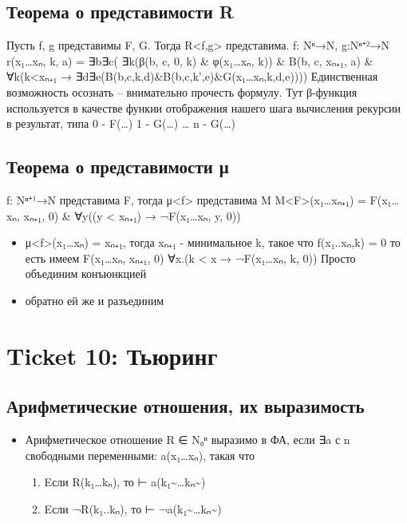 \documentclass[11pt]{article}
\begin{document}
\subsection{Теорема о представимости R}
\label{sec-11-6}
Пусть f, g представимы F, G. Тогда R<f,g> представима.
f: Nⁿ→N, g:Nⁿ⁺²→N
r(x₁\ldots{}xₙ, k, a) =
   ∃b∃c(
        ∃k(β(b, c, 0, k) \& φ(x₁\ldots{}xₙ, k))
        \& B(b, c, xₙ₊₁, a)
        \& ∀k(k<xₙ₊₁ → ∃d∃e(B(b,c,k,d)\&B(b,c,k',e)\&G(x₁\ldots{}xₙ,k,d,e))))
Единственная возможность осознать -- внимательно прочесть формулу.
Тут β-функция используется в качестве функии отображения нашего шага
вычисления рекурсии в результат, типа
0 - F(\ldots{})
1 - G(\ldots{})
\ldots{}
n - G(\ldots{})
\subsection{Теорема о представимости μ}
\label{sec-11-7}
f: Nⁿ⁺¹→N представима F, тогда μ<f> представима M
Μ<F>(x₁\ldots{}xₙ₊₁) = F(x₁\ldots{}xₙ, xₙ₊₁, 0) \& ∀y((y < xₙ₊₁) → ¬F(x₁\ldots{}xₙ, y, 0))
\begin{itemize}
\item μ<f>(x₁\ldots{}xₙ) = xₙ₊₁, тогда xₙ₊₁ - минимальное k, такое что f(x₁..xₙ,k) = 0
то есть имеем
F(x₁\ldots{}xₙ, xₙ₊₁, 0)
∀x.(k < x → ¬F(x₁\ldots{}xₙ, k, 0))
Просто объединим конъюнкцией
\item обратно ей же и разъединим
\end{itemize}
\section{Ticket 10: Тьюринг}
\label{sec-12}
\subsection{Арифметические отношения, их выразимость}
\label{sec-12-1}
\begin{itemize}
\item Арифметическое отношение R ∈ N₀ⁿ выразимо в ФА, если
∃a с n свободными переменными:
a(x₁\ldots{}xₙ), такая что
\begin{enumerate}
\item Eсли R(k₁\ldots{}kₙ), то ⊢ a(k₁\textasciitilde{}\ldots{}kₙ\textasciitilde{})
\item Eсли ¬R(k₁..kₙ), то ⊢ ¬a(k₁\textasciitilde{}\ldots{}kₙ\textasciitilde{})
\end{enumerate}
\end{itemize}
\end{document}
